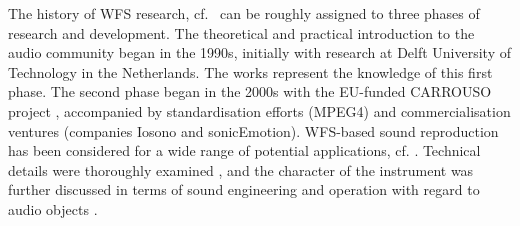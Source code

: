 The history of WFS research, cf.~\cite{Vries2009_Mono,Vries2019} can be
roughly assigned to three phases of research and development.
%
The theoretical and practical introduction to the audio community began in the
1990s, initially with research at Delft University of Technology in the Netherlands.
The works
\cite{Berkhout1993_JASA,Vogel1993_diss,Boone1995_JAES,Vries1996_JAES,
Start1997_diss,Verheijen1997_diss,Sonke2000_diss}
represent the knowledge of this first phase.
%
%
The second phase began in the 2000s with the EU-funded CARROUSO project
\cite{Brix2001}, accompanied by standardisation efforts (MPEG4)
\cite{Plogsties2003} and commercialisation ventures (companies Iosono and
sonicEmotion).
%
WFS-based sound reproduction has been considered for a wide range of potential
applications, cf. \cite{Sporer2004a,Theile2003}.
%
Technical details were thoroughly examined \cite{Apel2004,Hulsebos2004_diss,
Spors2007b,Corteel2006_JAES,Gauthier2007_JAES,Melchior2008,Franck2008,Salvador2010},
and the character of the instrument was further discussed in terms of sound
engineering \cite{Theile2003,Kuhn2003,Wittek2007_JAES,Wittek2007_diss} and
operation with regard to audio objects \cite{Melchior2003,Vaananen2003,
Pellegrini2004,Baalman2008_diss}.
%

